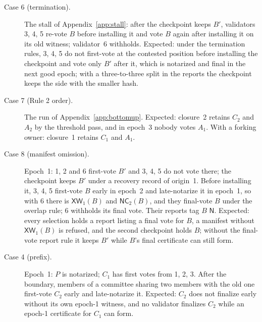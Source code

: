 \documentclass[conference]{IEEEtran}
\newcommand{\NC}{\mathsf{NC}}
\newcommand{\XW}{\mathsf{XW}}
\newcommand{\tagN}{\mathsf{N}}
\begin{document}
\begin{description}
\item[Case 6 (termination).] The stall of Appendix~\ref{app:stall}: after the checkpoint keeps $B'$, validators 3, 4, 5 re-vote $B$ before installing it and vote $B$ again after installing it on its old witness; validator~6 withholds. Expected: under the termination rules, 3, 4, 5 do not first-vote at the contested position before installing the checkpoint and vote only $B'$ after it, which is notarized and final in the next good epoch; with a three-to-three split in the reports the checkpoint keeps the side with the smaller hash.
\item[Case 7 (Rule 2 order).] The run of Appendix~\ref{app:bottomup}. Expected: closure~2 retains $C_2$ and $A_2$ by the threshold pass, and in epoch~3 nobody votes $A_1$. With a forking owner: closure~1 retains $C_1$ and $A_1$.
\item[Case 8 (manifest omission).] Epoch~1: 1, 2 and 6 first-vote $B'$ and 3, 4, 5 do not vote there; the checkpoint keeps $B'$ under a recovery record of origin~1. Before installing it, 3, 4, 5 first-vote $B$ early in epoch~2 and late-notarize it in epoch~1, so with 6 there is $\XW_1(B)$ and $\NC_2(B)$, and they final-vote $B$ under the overlap rule; 6 withholds its final vote. Their reports tag $B$ $\tagN$. Expected: every selection holds a report listing a final vote for $B$, a manifest without $\XW_1(B)$ is refused, and the second checkpoint holds $B$; without the final-vote report rule it keeps $B'$ while $B$'s final certificate can still form.
\item[Case 4 (prefix).] Epoch~1: $P$ is notarized; $C_1$ has first votes from 1, 2, 3. After the boundary, members of a committee sharing two members with the old one first-vote $C_2$ early and late-notarize it. Expected: $C_2$ does not finalize early without its own epoch-1 witness, and no validator finalizes $C_2$ while an epoch-1 certificate for $C_1$ can form.
\end{description}
\end{document}
